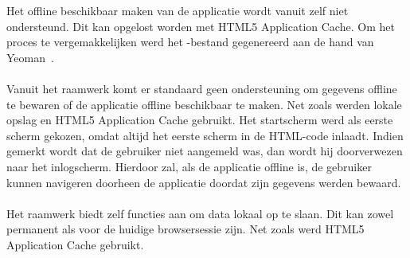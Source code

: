 Het offline beschikbaar maken van de applicatie wordt vanuit \kendo{} zelf niet ondersteund.
Dit kan opgelost worden met HTML5 Application Cache.
Om het proces te vergemakkelijken werd het -bestand gegenereerd aan de hand van Yeoman~\cite{Yeoman2013}.

\paragraph{\jqm}
Vanuit het raamwerk komt er standaard geen ondersteuning om gegevens offline te bewaren of de applicatie offline beschikbaar te maken.
Net zoals \kendo{} werden lokale opslag en HTML5 Application Cache gebruikt.
Het startscherm werd als eerste scherm gekozen, omdat \jqm{} altijd het eerste scherm in de HTML-code inlaadt.
Indien gemerkt wordt dat de gebruiker niet aangemeld was, dan wordt hij doorverwezen naar het inlogscherm.
Hierdoor zal, als de applicatie offline is, de gebruiker kunnen navigeren doorheen de applicatie doordat zijn gegevens werden bewaard.

\paragraph{\lungo}
Het raamwerk biedt zelf functies aan om data lokaal op te slaan.
Dit kan zowel permanent als voor de huidige browsersessie zijn.
Net zoals \kendo{} werd HTML5 Application Cache gebruikt.
